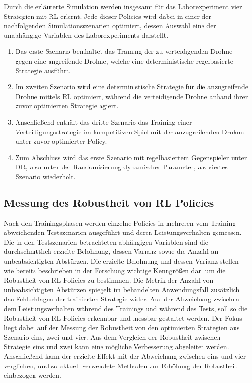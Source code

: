 Durch die erläuterte Simulation werden insgesamt für das Laborexperiment vier Strategien mit RL erlernt.
Jede dieser Policies wird dabei in einer der nachfolgenden Simulationsszenarien optimiert, dessen Auswahl eine der unabhängige Variablen des Laborexperiments darstellt.
\begin{enumerate}
    \item Das erste Szenario beinhaltet das Training der zu verteidigenden Drohne gegen eine angreifende Drohne, welche eine deterministische regelbasierte Strategie ausführt.
    \item Im zweiten Szenario wird eine deterministische Strategie für die anzugreifende Drohne mittels RL optimiert, während die verteidigende Drohne anhand ihrer zuvor optimierten Strategie agiert.
    \item Anschließend enthält das dritte Szenario das Training einer Verteidigungsstrategie im kompetitiven Spiel mit der anzugreifenden Drohne unter zuvor optimierter Policy.
    \item Zum Abschluss wird das erste Szenario mit regelbasiertem Gegenspieler unter DR, also unter der Randomisierung dynamischer Parameter, als viertes Szenario wiederholt. 
\end{enumerate}

\subsection{Messung des Robustheit von RL Policies}

Nach den Trainingsphasen werden einzelne Policies in mehreren vom Training abweichenden Testszenarien ausgeführt und deren Leistungsverhalten gemessen.
Die in den Testszenarien betrachteten abhängigen Variablen sind die durchschnittlich erzielte Belohnung, dessen Varianz sowie die Anzahl an unbeabsichtigten Abstürzen.
Die erzielte Belohnung und dessen Varianz stellen wie bereits beschrieben in der Forschung wichtige Kenngrößen dar, um die Robustheit von RL Policies zu bestimmen.
Die Metrik der Anzahl von unbeabsichtigten Abstürzen spiegelt im behandelten Anwendungsfall zusätzlich das Fehlschlagen der trainierten Strategie wider.
Aus der Abweichung zwischen dem Leistungsverhalten während des Trainings und während des Tests, soll so die Robustheit von RL Policies erkennbar und messbar gestaltet werden.
Der Fokus liegt dabei auf der Messung der Robustheit von den optimierten Strategien aus Szenario eins, zwei und vier.
Aus dem Vergleich der Robustheit zwischen Strategie eins und zwei kann eine mögliche Verbesserung abgeleitet werden.
Anschließend kann der erzielte Effekt mit der Abweichung zwischen eins und vier verglichen, und so aktuell verwendete Methoden zur Erhöhung der Robustheit einbezogen werden.

